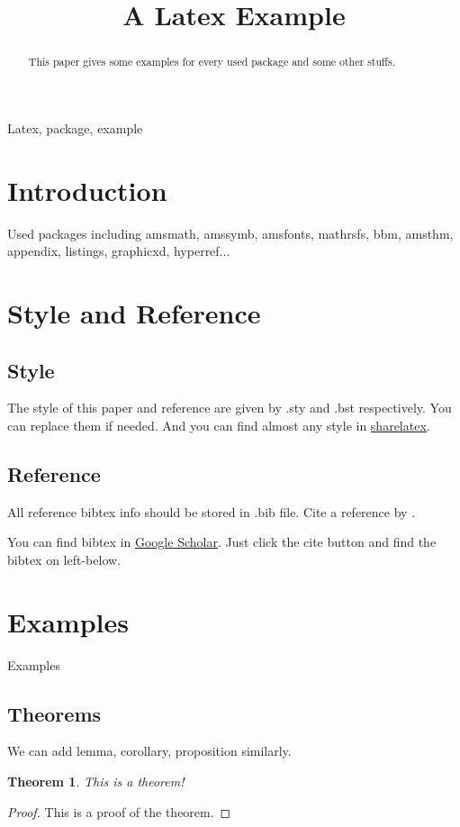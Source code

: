 \documentclass{article}
\title{A Latex Example}
\newtheorem{theorem}{Theorem}
\begin{document}
    \maketitle %

    \begin{abstract}
        This paper gives some examples for every used package and some other stuffs.
    \end{abstract}

    \begin{keywords}
        Latex, package, example
    \end{keywords}

    \section{Introduction}
    Used packages including amsmath, amssymb, amsfonts, mathrsfs, bbm, amsthm, appendix, listings, graphicxd, hyperref...

    \section{Style and Reference}
    \subsection{Style}
    The style of this paper and reference are given by .sty and .bst respectively.
    You can replace them if needed. 
    And you can find almost any style in \href{https://www.sharelatex.com/templates}{sharelatex}.
    
    \subsection{Reference}
    All reference bibtex info should be stored in .bib file.
    Cite a reference by \cite{referencekey}.

    You can find bibtex in \href{https://scholar.google.com}{Google Scholar}. Just click the cite button and find the bibtex on left-below.

    \section{Examples}
    Examples

    \subsection{Theorems}
    We can add lemma, corollary, proposition similarly.
    \begin{theorem}
        This is a theorem!
        \label{theorem_1}
    \end{theorem}
    \begin{proof}
        This is a proof of the theorem.
    \end{proof}
\end{document}
